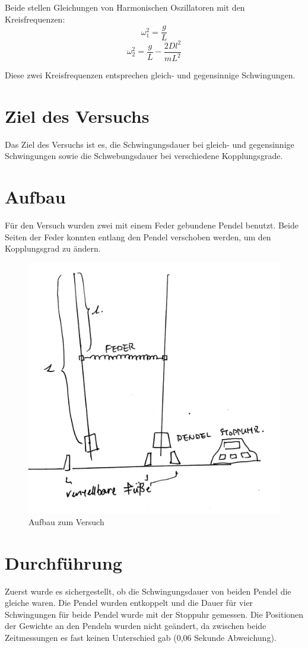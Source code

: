 \documentclass[11pt,a4paper]{article}
\begin{document}
Beide stellen Gleichungen von Harmonischen Oszillatoren mit den Kreisfrequenzen:
$$ \omega_1^2 = \frac{g}{L}$$
$$ \omega_2^2 = \frac{g}{L}-\frac{2Dl^2}{mL^2} $$

Diese zwei Kreisfrequenzen entsprechen gleich- und gegensinnige Schwingungen. 

\section{Ziel des Versuchs}
Das Ziel des Versuchs ist es, die Schwingungsdauer bei gleich- und gegensinnige Schwingungen sowie die Schwebungsdauer bei verschiedene Kopplungsgrade. 


\section{Aufbau}
Für den Versuch wurden zwei mit einem Feder gebundene Pendel benutzt. Beide Seiten der Feder konnten entlang den Pendel verschoben werden, um den Kopplungsgrad zu ändern. 
\begin{figure} [h]
	\centering
	\includegraphics[scale=0.1]{Abb1}
	\caption{Aufbau zum Versuch}
\end{figure}


\section{Durchführung}
Zuerst wurde es sichergestellt, ob die Schwingungsdauer von beiden Pendel die gleiche waren. Die Pendel wurden entkoppelt und die Dauer für vier Schwingungen für beide Pendel wurde mit der Stoppuhr gemessen. Die Positionen der Gewichte an den Pendeln wurden nicht geändert, da zwischen beide Zeitmessungen es fast keinen Unterschied gab (0,06 Sekunde Abweichung).
\end{document}
